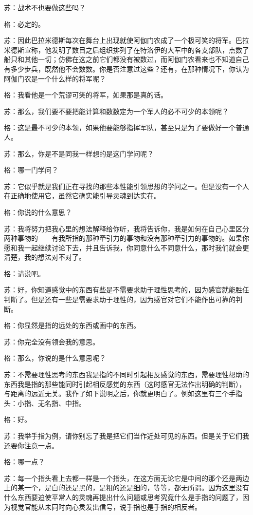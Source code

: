 \documentclass[12pt,oneside]{book}
\begin{document}
苏：战术不也要做这些吗？

格：必定的。

苏：因此巴拉米德斯每次在舞台上出现就使阿伽门农成了一个极可笑的将军。巴拉米德斯宣称，他发明了数目之后组织排列了在特洛伊的大军中的各支部队，点数了船只和其他一切；仿佛在这之前它们都没有被数过，而阿伽门农看来也不知道自己有多少步兵，既然他不会数数。你是否注意过这些？还有，在那种情况下，你认为阿伽门农是一个什么样的将军呢？

格：我看他是一个荒谬可笑的将军，如果那是真的话。

苏：那么，我们要不要把能计算和数数定为一个军人的必不可少的本领呢？

格：这是最不可少的本领，如果他要能够指挥军队，甚至只是为了要做好一个普通人。

苏：那么，你是不是同我一样想的是这门学问呢？

格：哪一门学问？

苏：它似乎就是我们正在寻找的那些本性能引领思想的学问之一。但是没有一个人在正确地使用它，虽然它确实能引导灵魂到达实在。

格：你说的什么意思？

苏：我将努力把我心里的想法解释给你听，我将告诉你，我是如何在自己心里区分两种事物的——有我所指的那种牵引力的事物和没有那种牵引力的事物的。如果你愿和我一起继续讨论下去，并且告诉我，你同意什么不同意什么，那时我们就会更清楚，我的想法对不对了。

格：请说吧。

苏：好，你知道感觉中的东西有些是不需要求助于理性思考的，因为感官就能胜任判断了。但是还有一些是需要求助于理性的，因为感官对它们不能作出可靠的判断。

格：你显然是指的远处的东西或画中的东西。

苏：你完全没有领会我的意思。

格：那么，你说的是什么意思呢？

苏：不需要理性思考的东西我是指的不同时引起相反感觉的东西，需要理性帮助的东西我是指的那些能同时引起相反感觉的东西（这时感官无法作出明确的判断），与距离的远近无关。我作了如下说明之后，你就更明白了。例如这里有三个手指头：小指、无名指、中指。

格：好。

苏：我举手指为例，请你别忘了我是把它们当作近处可见的东西。但是关于它们我还要你注意一点。

格：哪一点？

苏：每一个指头看上去都一样是一个指头，在这方面无论它是中间的那个还是两边上的某一个，是白的还是黑的，是粗的还是细的，等等，都无所谓。因为这里没有什么东西要迫使平常人的灵魂再提出什么问题或思考究竟什么是手指的问题了，因为视觉官能从未同时向心灵发出信号，说手指也是手指的相反者。
\end{document}
